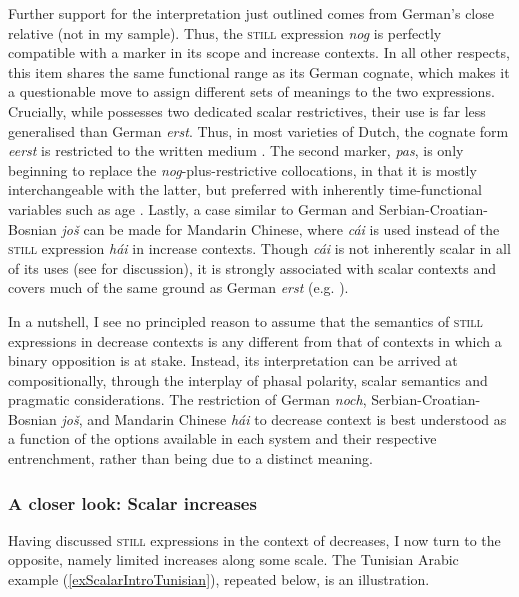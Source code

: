 Further support for the interpretation just outlined comes from German's close relative  (not in my sample). Thus, the  \textsc{still} expression \textit{nog} is perfectly compatible with a  marker in its scope and increase contexts. In all other respects, this item shares the same functional range as its German cognate, which makes it a questionable move to assign different sets of meanings to the two expressions. Crucially, while  possesses two dedicated scalar restrictives, their use is far less generalised than German \textit{erst}. Thus, in most varieties of Dutch, the cognate form \textit{eerst} is restricted to the written medium \parencite[72]{Vandeweghe1992}. The second marker, \textit{pas}, is only beginning to replace the \textit{nog}-plus-restrictive collocations, in that it is mostly interchangeable with the latter, but preferred with inherently time-functional variables such as age \parencite[110]{Vandeweghe1992}. Lastly, a case similar to German and  Serbian\hyp Croatian\hyp Bosnian \textit{još} can be made for Mandarin Chinese, where  \textit{cái} is used instead of the \textsc{still} expression \textit{hái} in increase contexts. Though \textit{cái} is not inherently scalar in all of its uses (see \cite[ch. 4.1]{Hole2004} for discussion), it is strongly associated with scalar contexts and covers much of the same ground as German \textit{erst} (e.g. \cite{Lai1999}).

In a nutshell, I see no principled reason to assume that the semantics of \textsc{still} expressions in decrease contexts is any different from that of contexts in which a binary opposition is at stake. Instead, its interpretation can be arrived at compositionally, through the interplay of phasal polarity, scalar semantics and pragmatic considerations. The restriction of German \textit{noch}, Serbian\hyp Croatian\hyp Bosnian \textit{još}, and Mandarin Chinese \textit{hái} to decrease context is best understood as a function of the options available in each system and their respective entrenchment, rather than being due to a distinct meaning.

\subsubsection{A closer look: Scalar increases}
Having discussed \textsc{still} expressions in the context of decreases, I now turn to the opposite, namely limited increases along some scale. The Tunisian Arabic example (\ref{exScalarIntroTunisian}), repeated below, is an illustration.

